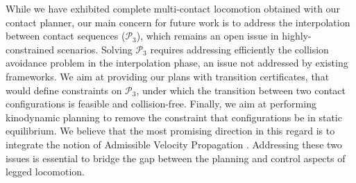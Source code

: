 \documentclass[journal]{IEEEtran}
\begin{document}
While we have exhibited complete multi-contact locomotion obtained with our contact planner, our main concern for future work is to address the interpolation
between contact sequences ($\mathcal{P}_3$), which remains an open issue in highly-constrained scenarios.
Solving $\mathcal{P}_3$ requires addressing efficiently the collision avoidance problem in the interpolation phase, an issue 
not addressed by existing frameworks. We aim at providing our plans with transition certificates, that would define constraints on $\mathcal{P}_3$, under which
the transition between two contact configurations is feasible and collision-free.
Finally, we aim at performing kinodynamic planning to remove the constraint that configurations be in static equilibrium. We believe that the most promising direction in this regard is to integrate the notion of Admissible Velocity Propagation \citep{DBLP:conf/rss/PhamCN13}.
Addressing these two issues is essential to bridge the gap between the planning and control aspects of legged locomotion.


%
%

\end{document}
